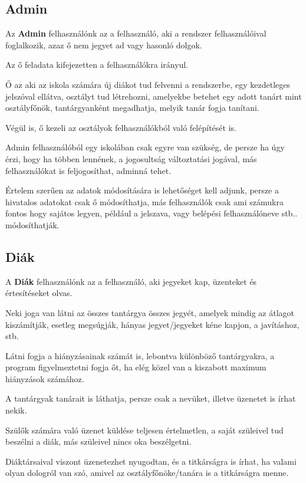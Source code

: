 \subsection{Admin}\label{subsec:RESZLETESLEIRAS:cel:admin}
Az {\bf Admin} felhasználónk az a felhasználó, aki a rendszer felhasználóival foglalkozik, azaz ő nem jegyet ad vagy hasonló dolgok.

Az ő feladata kifejezetten a felhasználókra irányul.

Ő az aki az iskola számára új diákot tud felvenni a rendszerbe, egy kezdetleges jelszóval ellátva, osztályt tud létrehozni, amelyekbe betehet egy adott tanárt mint osztályfőnök, tantárgyanként megadhatja, melyik tanár fogja tanítani. 

Végül is, ő kezeli az osztályok felhasználókból való felépítését is.

Admin felhasználóból egy iskolában csak egyre van szükség, de persze ha úgy érzi, hogy ha többen lennének, a jogosultság változtatási jogával, más felhasználókat is feljogosíthat, adminná tehet.

Értelem szerűen az adatok módosítására is lehetőséget kell adjunk, persze a hivatalos adatokat csak ő módosíthatja, más felhasználók csak ami számukra fontos hogy sajátos legyen, például a jelszava, vagy belépési felhasználóneve stb.. módosíthatják.

\subsection{Diák}\label{subsec:RESZLETESLEIRAS:cel:diak}
A {\bf Diák} felhasználónk az a felhasználó, aki jegyeket kap, üzenteket és értesítéseket olvas.

Neki joga van látni az összes tantárgya összes jegyét, amelyek mindig az átlagot kiszámítják, esetleg megsúgják, hányas jegyet/jegyeket kéne kapjon, a javításhoz, stb.

Látni fogja a hiányzásainak számát is, lebontva különböző tantárgyakra, a program figyelmeztetni fogja őt, ha elég közel van a kiszabott maximum hiányzások számához.

A tantárgyak tanárait is láthatja, persze csak a nevüket, illetve üzenetet is írhat nekik.

Szülők számára való üzenet küldése teljesen értelmetlen, a saját szüleivel tud beszélni a diák, más szüleivel nincs oka beszélgetni.

Diáktársaival viszont üzenetezhet nyugodtan, és a titkárságra is írhat, ha valami olyan dologról van szó, amivel az osztályfőnöke/tanára is a titkárságra menne. 

